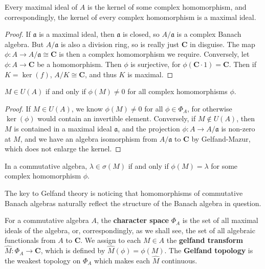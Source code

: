 \begin{lemma}
    Every maximal ideal of $A$ is the kernel of some complex homomorphism, and correspondingly, the kernel of every complex homomorphism is a maximal ideal.
\end{lemma}
\begin{proof}
    If $\mathfrak{a}$ is a maximal ideal, then $\mathfrak{a}$ is closed, so $A/\mathfrak{a}$ is a complex Banach algebra. But $A/\mathfrak{a}$ is also a division ring, so is really just $\mathbf{C}$ in disguise. The map $\phi: A \to A/\mathfrak{a} \cong \mathbf{C}$ is then a complex homomorphism we require. Conversely, let $\phi: A \to \mathbf{C}$ be a homomorphism. Then $\phi$ is surjective, for $\phi(\mathbf{C} \cdot 1) = \mathbf{C}$. Then if $K = \ker(f)$, $A/K \cong \mathbf{C}$, and thus $K$ is maximal.
\end{proof}

\begin{lemma}
    $M \in U(A)$ if and only if $\phi(M) \neq 0$ for all complex homomorphisms $\phi$.
\end{lemma}
\begin{proof}
    If $M \in U(A)$, we know $\phi(M) \neq 0$ for all $\phi \in \Phi_A$, for otherwise $\ker(\phi)$ would contain an invertible element. Conversely, if $M \not \in U(A)$, then $M$ is contained in a maximal ideal $\mathfrak{a}$, and the projection $\phi: A \to A/\mathfrak{a}$ is non-zero at $M$, and we have an algebra isomorphism from $A/\mathfrak{a}$ to $\mathbf{C}$ by Gelfand-Mazur, which does not enlarge the kernel.
\end{proof}

\begin{corollary} \label{spectralhomomorphism}
    In a commutative algebra, $\lambda \in \sigma(M)$ if and only if $\phi(M) = \lambda$ for some complex homomorphism $\phi$.
\end{corollary}

The key to Gelfand theory is noticing that homomorphisms of commutative Banach algebras naturally reflect the structure of the Banach algebra in question.

\begin{definition}
    For a commutative algebra $A$, the {\bf character space} $\Phi_A$ is the set of all maximal ideals of the algebra, or, correspondingly, as we shall see, the set of all algebraic functionals from $A$ to $\mathbf{C}$. We assign to each $M \in A$ the {\bf gelfand transform} $\widehat{M}: \Phi_A \to \mathbf{C}$, which is defined by $\widehat{M}(\phi) = \phi(M)$. The {\bf Gelfand topology} is the weakest topology on $\Phi_A$ which makes each $\widehat{M}$ continuous.
\end{definition}

